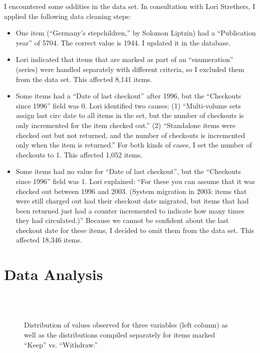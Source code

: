 \documentclass[man,11pt]{apa6}
\begin{document}
I encountered some oddities in the data set.  In consultation with
Lori Strethers, I applied the following data cleaning steps:
\begin{itemize}
\item One item (``Germany's stepchildren,'' by Solomon Liptzin) had a
  ``Publication year'' of 5704.  The correct value is 1944.  I updated it
  in the database.

\item Lori indicated that items that are marked as part of an
  ``enumeration'' (series) were handled separately with different
  criteria, so I excluded them from the data set.  This affected 8,141
  items. 

\item Some items had a ``Date of last checkout'' after 1996, but the
   ``Checkouts since 1996'' field was 0.  Lori identified two causes:
(1) ``Multi-volume sets assign last circ date to all items in the set,
  but the number of checkouts is only incremented for the item checked out.''
(2)  ``Standalone items were checked out but not returned, and the 
  number of checkouts is incremented only when the item is returned.''
For both kinds of cases, I set the number of checkouts to 1.  This
affected 1,052 items.

\item Some items had no value for ``Date of last checkout'', but the
  ``Checkouts since 1996'' field was 1.  Lori explained: ``For these
  you can assume that it was checked out between 1996 and 2003.
  (System migration in 2003: items that were still charged out had
  their checkout date migrated, but items that had been returned just
  had a counter incremented to indicate how many times they had
  circulated.)''
%
Because we cannot be confident about the last checkout date for these
items, I decided to omit them from the data set. This affected 18,346
items. 

\end{itemize}

\section{Data Analysis}

\begin{figure}
\centering
{} 
\\
\\
\caption{Distribution of values observed for three variables (left
  column) as well as the distributions compiled separately for items
  marked ``Keep'' vs. ``Withdraw.''}
\label{fig:dist}
\end{figure}
\end{document}
